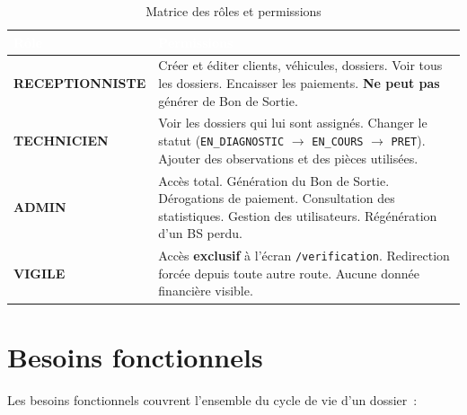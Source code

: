 \documentclass[11pt,a4paper]{report}
\begin{document}
\begin{table}[h!]
\centering
{}
\begin{tabularx}{\linewidth}{@{}l>{\raggedright\arraybackslash}X@{}}
\toprule
\rowcolor{km0blue}
\textcolor{white}{\textbf{Rôle}} & \textcolor{white}{\textbf{Permissions}} \\
\midrule
\textbf{RECEPTIONNISTE} & Créer et éditer clients, véhicules, dossiers. Voir tous les dossiers.
Encaisser les paiements. \textbf{Ne peut pas} générer de Bon de Sortie. \\
\textbf{TECHNICIEN} & Voir les dossiers qui lui sont assignés. Changer le statut
(\texttt{EN\_DIAGNOSTIC} $\rightarrow$ \texttt{EN\_COURS} $\rightarrow$ \texttt{PRET}).
Ajouter des observations et des pièces utilisées. \\
\textbf{ADMIN} & Accès total. Génération du Bon de Sortie. Dérogations de paiement.
Consultation des statistiques. Gestion des utilisateurs. Régénération d'un BS perdu. \\
\textbf{VIGILE} & Accès \textbf{exclusif} à l'écran \texttt{/verification}. Redirection forcée
depuis toute autre route. Aucune donnée financière visible. \\
\bottomrule
\end{tabularx}
\caption{Matrice des rôles et permissions}
\end{table}

\section{Besoins fonctionnels}

Les besoins fonctionnels couvrent l'ensemble du cycle de vie d'un dossier~:
\end{document}
